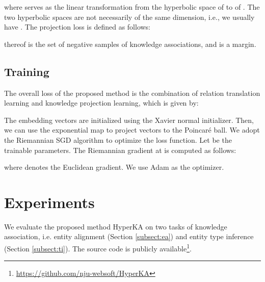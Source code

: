 \documentclass[11pt,a4paper]{article}
\newcommand{\modelname}{HyperKA\xspace}
\begin{document}
where  serves as the linear transformation from the hyperbolic space  of  to  of . The two hyperbolic spaces are not necessarily of the same dimension, i.e., we usually have . The projection loss is defined as follows:

 thereof is the set of negative samples of knowledge associations, and  is a margin. 

\subsection{Training}
The overall loss of the proposed method is the combination of relation translation learning and knowledge projection learning, which is given by:


\noindent
The embedding vectors are initialized using the Xavier normal initializer. Then, we can use the exponential map to project vectors to the Poincar\'e ball. We adopt the Riemannian SGD algorithm \cite{Bonnabel13RSGD} to optimize the loss function. Let  be the trainable parameters. The Riemannian gradient  at  is computed as follows:

where  denotes the Euclidean gradient. We use Adam \cite{Adam} as the optimizer.
 \section{Experiments}
We evaluate the proposed method \modelname on two tasks of knowledge association, i.e. entity alignment (Section \ref{subsect:ea}) and entity type inference (Section \ref{subsect:ti}). The source code is publicly available\footnote{\url{https://github.com/nju-websoft/HyperKA}}.
\end{document}
